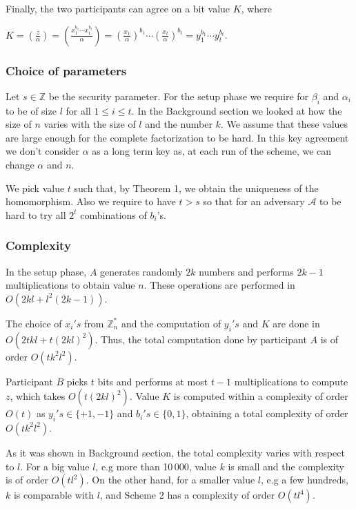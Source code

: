 \documentclass[11pt, a4paper, twoside, openright]{report}
\begin{document}
	Finally, the two participants can agree on a bit value $K$, where 
	
	$K = (\frac{z}{\alpha}) = (\frac{x_1^{b_1} \cdots x_t^{b_t}}{\alpha}) = (\frac{x_1}{\alpha})^{b_1} \cdots (\frac{x_t}{\alpha})^{b_t} = y_1^{b_1} \cdots y_t^{b_t}$.   	

		\subsubsection{Choice of parameters}
			Let $s \in \mathbb{Z}$ be the security parameter. 
			 For the setup phase we require for $ \beta_i $ and $ \alpha_i$ to be of size $l$ for all $1 \leq i \leq t$. 
			 In the Background section we looked at how the size of $n$ varies with the size of $l$ and the number $k$. We assume that these values 
			 are large enough for the complete factorization to be hard.
			In this key agreement we don't consider $\alpha$ as a long term key as, at each run of the scheme, we can change $\alpha$
			and $n$. 
			
			We pick value $t$ such that, by Theorem 1, we obtain the uniqueness of the homomorphism. Also we require to have 
			$t > s$ so that for an adversary $\mathcal{A}$ to be hard to try all $2^t$ combinations of $b_i$'s. 
			
		
		\subsubsection{Complexity} 
		
			In the setup phase, $A$ generates randomly $2k$ numbers and performs $2k-1$ multiplications
			to obtain value $n$. These operations are performed in $O(2kl + l^2(2k-1))$. 
			
			The choice of $x_i's$ from $\mathbb{Z}_n^*$ and the computation of $y_i's$ and $K$
			are done in $O(2tkl+ t(2kl)^2)$. Thus, the total computation done by participant $A$ is
			of order $O(tk^2l^2)$.
			
			Participant $B$ picks $t$ bits and performs at most $t-1$ multiplications 
			to compute $z$, which takes $O(t (2kl)^2)$. Value $K$ is computed within a complexity of order
			 $O(t)$ as $y_i's \in \{+1,-1\}$
			and $b_i's \in \{0,1\}$, obtaining a total complexity of order $O(tk^2l^2)$.
			
			As it was shown in Background section, the total complexity varies with respect to $l$. For a 
			big value $l$, e.g more than 10\,000, value $k$ is small and the complexity is of order $O(tl^2)$.
			 On the other hand, 
			for a smaller value $l$, e.g a few hundreds, $k$ is comparable with $l$, and Scheme 2 has a complexity 
			of order $O(tl^4)$.  
		
\end{document}
